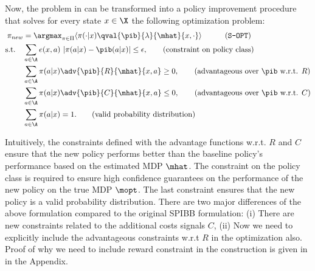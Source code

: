 Now, the problem in  can be transformed into a policy improvement procedure that solves for every state $x \in \X$ the following optimization problem:
\begin{align*}
    \label{eq:s-opt}
    \pi_{new} &= \argmax_{\pi \in \Pi} \langle \pi(\cdot|x) \qval{\pib}{\lambda}{\mhat}{x,\cdot} \rangle \quad  \tag{$\texttt{S-OPT}$} \\  
    \text{s.t.} \quad    
    &\sum_{a \in \A} e(x,a)\ |\pi(a|x) - \pib(a|x)| \leq \epsilon, \tag{constraint on policy class} \\ 
    &\sum_{a \in \A} \pi(a|x) \adv{\pib}{R}{\mhat}{x, a} \geq 0, \tag{advantageous over $\pib$ w.r.t. $R$} \\
    &\sum_{a \in \A} \pi(a|x) \adv{\pib}{C}{\mhat}{x, a} \leq 0, \tag{advantageous over $\pib$ w.r.t. $C$} \\
    &\sum_{a \in \A} \pi(a|x) = 1. \tag{valid probability distribution}
\end{align*}

Intuitively, the constraints defined with the advantage functions w.r.t. $R$ and $C$ ensure that the new policy performs better than the baseline policy's performance based on the estimated MDP $\mhat$. The constraint on the policy class  is required to ensure high confidence guarantees on the performance of the new policy on the true MDP $\mopt$. The last constraint ensures that the new policy is a valid probability distribution.
There are two major differences of the above formulation compared to the original SPIBB formulation: (i) There are new constraints related to the additional costs signals $C$, (ii) Now we need to explicitly include the advantageous constraints w.r.t $R$ in the optimization also. Proof of why we need to include reward constraint in the construction is given in  in the Appendix.




